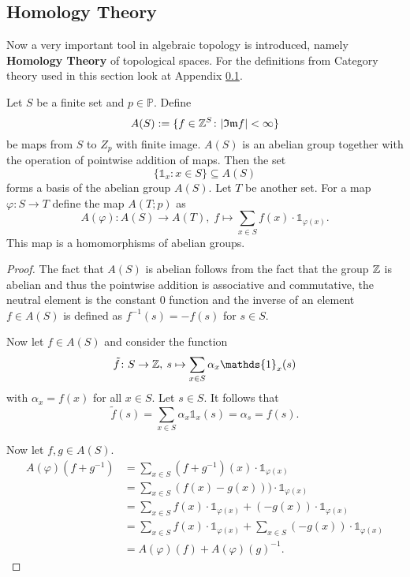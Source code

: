 \subsection{Homology Theory}
Now a very important tool in algebraic topology is introduced, namely \textbf{Homology Theory} of topological spaces. For the definitions from Category theory used in this section look at Appendix \ref{}. 

\begin{cons}
  Let $S$ be a finite set and $p \in \mathbb{P}$. Define \[A(S) := \{f \in \mathbb{Z}^S\colon |\mathfrak{Im} f| < \infty \}\] be maps from $S$ to $Z_p$ with finite image. $A(S)$ is an abelian group together with the operation of pointwise addition of maps.
  Then the set \[\{\mathds{1}_x\colon x\in S\} \subseteq A(S)\] forms a basis of the abelian group $A(S)$.
  Let $T$ be another set. For a map $\varphi\colon S \to T$ define the map $A(T; p)$ as
  \begin{equation*}
    A(\varphi)\colon A(S) \to A(T),\; f \mapsto \sum\limits_{x \in S}f(x)\cdot \mathds{1}_{\varphi(x)}.
  \end{equation*}
  This map is a homomorphisms of abelian groups.
\end{cons}

\begin{proof} 
  The fact that $A(S)$ is abelian follows from the fact that the group $\mathbb{Z}$ is abelian and thus the pointwise addition is associative and commutative, the neutral element is the constant $0$ function and the inverse of an element $f \in A(S)$ is defined as $f^{-1}(s) = -f(s)$ for $s \in S$.

  Now let $f \in A(S)$ and consider the function \[\tilde{f}\colon S \to \Z, \: s \mapsto \sum\limits_{x\in S} \alpha_x \mathds{1}_x(s)\] with $\alpha_x = f(x)$ for all $x \in S$. Let $s \in S$. It follows that
  \begin{equation*}
    \tilde{f}(s) = \sum\limits_{x \in S} \alpha_x \mathds{1}_x(s) = \alpha_s = f(s).
  \end{equation*}

  Now let $f,g \in A(S)$.
  \begin{align*}
    A(\varphi)(f+g^{-1}) &= \sum\limits_{x\in S} (f+g^{-1})(x)\cdot \mathds{1}_{\varphi(x)} \\
                        &= \sum\limits_{x\in S} (f(x)-g(x)))\cdot \mathds{1}_{\varphi(x)} \\
                        &= \sum\limits_{x\in S} f(x)\cdot\mathds{1}_{\varphi(x)} + (-g(x))\cdot \mathds{1}_{\varphi(x)} \\
                        &= \sum\limits_{x\in S} f(x)\cdot\mathds{1}_{\varphi(x)} + \sum\limits_{x\in S} (-g(x))\cdot \mathds{1}_{\varphi(x)} \\
                        &= A(\varphi)(f) + A(\varphi)(g)^{-1}.  
  \end{align*}
\end{proof}

